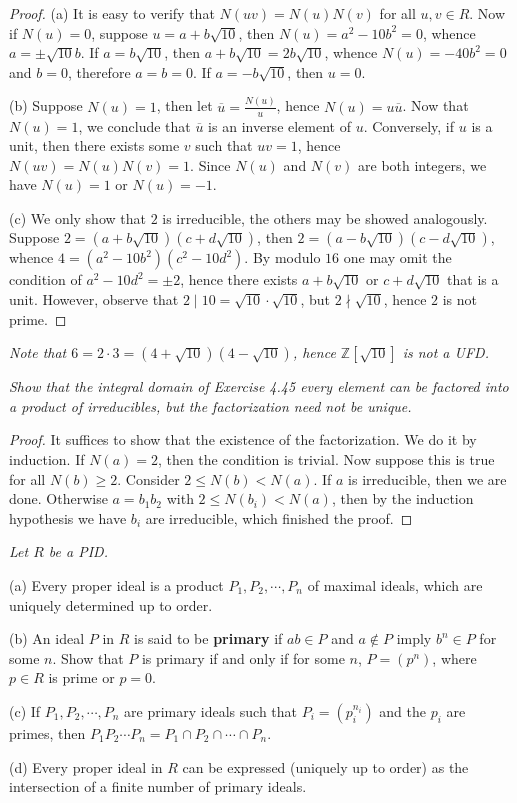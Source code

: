 \begin{proof}
(a) It is easy to verify that $N(uv)=N(u)N(v)$ for all $u,v\in R$. Now if $N(u)=0$, suppose $u=a+b\sqrt{10}$, then $N(u)=a^2-10b^2=0$, whence $a=\pm\sqrt{10}b$. If $a=b\sqrt{10}$, then $a+b\sqrt{10}=2b\sqrt{10}$, whence $N(u)=-40b^2=0$ and $b=0$, therefore $a=b=0$. If $a=-b\sqrt{10}$, then $u=0$.\par
(b) Suppose $N(u)=1$, then let $\overline{u}=\frac{N(u)}{u}$, hence $N(u)=u\overline{u}$. Now that $N(u)=1$, we conclude that $\overline{u}$ is an inverse element of $u$. Conversely, if $u$ is a unit, then there exists some $v$ such that $uv=1$, hence $N(uv)=N(u)N(v)=1$. Since $N(u)$ and $N(v)$ are both integers, we have $N(u)=1$ or $N(u)=-1$.\par
(c) We only show that $2$ is irreducible, the others may be showed analogously. Suppose $2=(a+b\sqrt{10})(c+d\sqrt{10})$, then $2=(a-b\sqrt{10})(c-d\sqrt{10})$, whence $4=(a^2-10b^2)(c^2-10d^2)$. By modulo $16$ one may omit the condition of $a^2-10d^2=\pm2$, hence there exists $a+b\sqrt{10}$ or $c+d\sqrt{10}$ that is a unit. However, observe that $2\mid 10=\sqrt{10}\cdot\sqrt{10}$, but $2\nmid\sqrt{10}$, hence $2$ is not prime.
\end{proof}
\begin{note}\em
Note that $6=2\cdot 3=(4+\sqrt{10})(4-\sqrt{10})$, hence $\mathbb{Z}[\sqrt{10}]$ is not a UFD.
\end{note}
\begin{problem}\em
Show that the integral domain of Exercise 4.45 every element can be factored into a product of irreducibles, but the factorization need not be unique.
\end{problem}
\begin{proof}
It suffices to show that the existence of the factorization. We do it by induction. If $N(a)=2$, then the condition is trivial. Now suppose this is true for all $N(b)\ge 2$. Consider $2\le N(b)<N(a)$. If $a$ is irreducible, then we are done. Otherwise $a=b_1b_2$ with $2\le N(b_i)<N(a)$, then by the induction hypothesis we have $b_i$ are irreducible, which finished the proof.
\end{proof}
\begin{problem}\em
Let $R$ be a PID.\par
(a) Every proper ideal is a product $P_1,P_2,\cdots,P_n$ of maximal ideals, which are uniquely determined up to order.\par
(b) An ideal $P$ in $R$ is said to be \textbf{primary} if $ab\in P$ and $a\notin P$ imply $b^n\in P$ for some $n$. Show that $P$ is primary if and only if for some $n$, $P=(p^n)$, where $p\in R$ is prime or $p=0$.\par
(c) If $P_1,P_2,\cdots,P_n$ are primary ideals such that $P_i=(p_i^{n_i})$ and the $p_i$ are primes, then $P_1P_2\cdots P_n=P_1\cap P_2\cap\cdots\cap P_n$.\par
(d) Every proper ideal in $R$ can be expressed (uniquely up to order) as the intersection of a finite number of primary ideals.
\end{problem}
